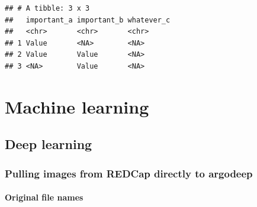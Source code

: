 \documentclass[
]{book}
\newenvironment{Shaded}{\begin{snugshade}}{\end{snugshade}}
\newcommand{\KeywordTok}[1]{\textcolor[rgb]{0.13,0.29,0.53}{\textbf{#1}}}
\newcommand{\NormalTok}[1]{#1}
\newcommand{\OperatorTok}[1]{\textcolor[rgb]{0.81,0.36,0.00}{\textbf{#1}}}
\newcommand{\StringTok}[1]{\textcolor[rgb]{0.31,0.60,0.02}{#1}}
\begin{document}
\begin{Shaded}
\end{Shaded}

\begin{verbatim}
## # A tibble: 3 x 3
##   important_a important_b whatever_c
##   <chr>       <chr>       <chr>     
## 1 Value       <NA>        <NA>      
## 2 Value       Value       <NA>      
## 3 <NA>        Value       <NA>
\end{verbatim}

\hypertarget{machine-learning}{%
\chapter{Machine learning}\label{machine-learning}}

\hypertarget{deep-learning}{%
\section{Deep learning}\label{deep-learning}}

\hypertarget{pulling-images-from-redcap-directly-to-argodeep}{%
\subsection{Pulling images from REDCap directly to argodeep}\label{pulling-images-from-redcap-directly-to-argodeep}}

\hypertarget{original-file-names}{%
\subsubsection{Original file names}\label{original-file-names}}
\end{document}
